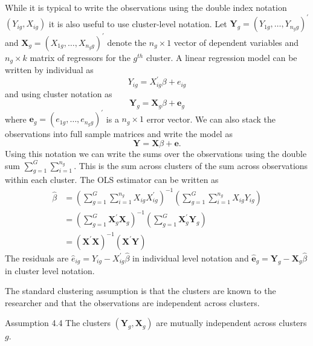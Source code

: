 \documentclass[10pt]{article}
\begin{document}
While it is typical to write the observations using the double index notation $\left(Y_{i g}, X_{i g}\right)$ it is also useful to use cluster-level notation. Let $\boldsymbol{Y}_{g}=\left(Y_{1 g}, \ldots, Y_{n_{g} g}\right)^{\prime}$ and $\boldsymbol{X}_{g}=\left(X_{1 g}, \ldots, X_{n_{g} g}\right)^{\prime}$ denote the $n_{g} \times 1$ vector of dependent variables and $n_{g} \times k$ matrix of regressors for the $g^{t h}$ cluster. A linear regression model can be written by individual as
$$
Y_{i g}=X_{i g}^{\prime} \beta+e_{i g}
$$
and using cluster notation as
$$
\boldsymbol{Y}_{g}=\boldsymbol{X}_{g} \beta+\boldsymbol{e}_{g}
$$
where $\boldsymbol{e}_{g}=\left(e_{1 g}, \ldots, e_{n_{g} g}\right)^{\prime}$ is a $n_{g} \times 1$ error vector. We can also stack the observations into full sample matrices and write the model as
$$
\boldsymbol{Y}=\boldsymbol{X} \beta+\boldsymbol{e} .
$$
Using this notation we can write the sums over the observations using the double sum $\sum_{g=1}^{G} \sum_{i=1}^{n_{g}}$. This is the sum across clusters of the sum across observations within each cluster. The OLS estimator can be written as
$$
\begin{aligned}
\widehat{\beta} &=\left(\sum_{g=1}^{G} \sum_{i=1}^{n_{g}} X_{i g} X_{i g}^{\prime}\right)^{-1}\left(\sum_{g=1}^{G} \sum_{i=1}^{n_{g}} X_{i g} Y_{i g}\right) \\
&=\left(\sum_{g=1}^{G} \boldsymbol{X}_{g}^{\prime} \boldsymbol{X}_{g}\right)^{-1}\left(\sum_{g=1}^{G} \boldsymbol{X}_{g}^{\prime} \boldsymbol{Y}_{g}\right) \\
&=\left(\boldsymbol{X}^{\prime} \boldsymbol{X}\right)^{-1}\left(\boldsymbol{X}^{\prime} \boldsymbol{Y}\right)
\end{aligned}
$$
The residuals are $\widehat{e}_{i g}=Y_{i g}-X_{i g}^{\prime} \widehat{\beta}$ in individual level notation and $\widehat{\boldsymbol{e}}_{g}=\boldsymbol{Y}_{g}-\boldsymbol{X}_{g} \widehat{\beta}$ in cluster level notation.

The standard clustering assumption is that the clusters are known to the researcher and that the observations are independent across clusters.

Assumption 4.4 The clusters $\left(\boldsymbol{Y}_{g}, \boldsymbol{X}_{g}\right)$ are mutually independent across clusters $g$.
\end{document}
